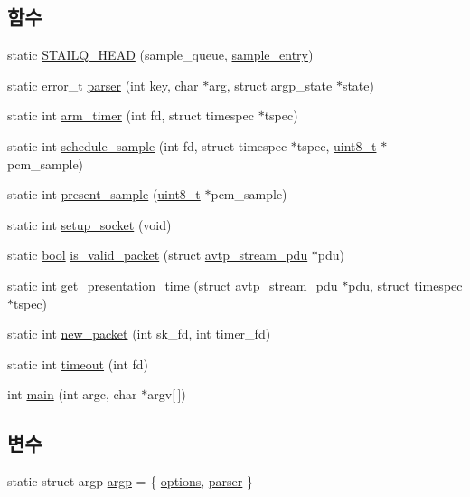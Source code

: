 \subsection*{함수}
\begin{DoxyCompactItemize}
\item 
static \hyperlink{aaf-listener_8c_a43629b469704e1765673dea619f84454}{S\+T\+A\+I\+L\+Q\+\_\+\+H\+E\+AD} (sample\+\_\+queue, \hyperlink{structsample__entry}{sample\+\_\+entry})
\item 
static error\+\_\+t \hyperlink{aaf-listener_8c_aa4dfc09c5a09d2e347cd355dfdecba57}{parser} (int key, char $\ast$arg, struct argp\+\_\+state $\ast$state)
\item 
static int \hyperlink{aaf-listener_8c_a4087791d7eed1c4cdfa65b841601c5a0}{arm\+\_\+timer} (int fd, struct timespec $\ast$tspec)
\item 
static int \hyperlink{aaf-listener_8c_a4d4e3f1353c49077c865384052a66aa2}{schedule\+\_\+sample} (int fd, struct timespec $\ast$tspec, \hyperlink{stdint_8h_aba7bc1797add20fe3efdf37ced1182c5}{uint8\+\_\+t} $\ast$pcm\+\_\+sample)
\item 
static int \hyperlink{aaf-listener_8c_aca821bd61e3f356d8e26a4be812affee}{present\+\_\+sample} (\hyperlink{stdint_8h_aba7bc1797add20fe3efdf37ced1182c5}{uint8\+\_\+t} $\ast$pcm\+\_\+sample)
\item 
static int \hyperlink{aaf-listener_8c_aad31b1ae23d50a606d0b3cc45d346f4e}{setup\+\_\+socket} (void)
\item 
static \hyperlink{avb__gptp_8h_af6a258d8f3ee5206d682d799316314b1}{bool} \hyperlink{aaf-listener_8c_a0f404f938e1dca24ac2365f4c11fe142}{is\+\_\+valid\+\_\+packet} (struct \hyperlink{structavtp__stream__pdu}{avtp\+\_\+stream\+\_\+pdu} $\ast$pdu)
\item 
static int \hyperlink{aaf-listener_8c_adcf17f48b1ca0dde610d14b0212c023d}{get\+\_\+presentation\+\_\+time} (struct \hyperlink{structavtp__stream__pdu}{avtp\+\_\+stream\+\_\+pdu} $\ast$pdu, struct timespec $\ast$tspec)
\item 
static int \hyperlink{aaf-listener_8c_a17a073ddf3b61d9030710c8da691b0c5}{new\+\_\+packet} (int sk\+\_\+fd, int timer\+\_\+fd)
\item 
static int \hyperlink{aaf-listener_8c_a869c60cb165af7b6177060c00c5c416c}{timeout} (int fd)
\item 
int \hyperlink{aaf-listener_8c_a0ddf1224851353fc92bfbff6f499fa97}{main} (int argc, char $\ast$argv\mbox{[}$\,$\mbox{]})
\end{DoxyCompactItemize}
\subsection*{변수}
\begin{DoxyCompactItemize}
\item 
static struct argp \hyperlink{aaf-listener_8c_ab70c96531b1b652d70c221cfaf3207f3}{argp} = \{ \hyperlink{aaf-talker_8c_abc1fd3a47aea6a8944038c9100eb9135}{options}, \hyperlink{aaf-talker_8c_aa4dfc09c5a09d2e347cd355dfdecba57}{parser} \}
\end{DoxyCompactItemize}


